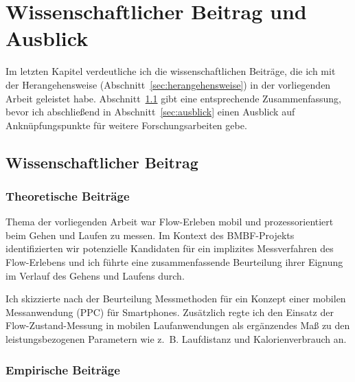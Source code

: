 

\chapter{Wissenschaftlicher Beitrag und Ausblick}

\label{cha:wissenschaftlicher_beitrag_und_ausblick}

Im letzten Kapitel verdeutliche ich die wissenschaftlichen Beiträge, die ich mit der Herangehensweise (Abschnitt~\ref{sec:herangehensweise}) in der vorliegenden Arbeit geleistet habe. Abschnitt~\ref{sec:wissenschaftlicher_beitrag} gibt eine entsprechende Zusammenfassung, bevor ich abschließend in Abschnitt~\ref{sec:ausblick} einen Ausblick auf Anknüpfungspunkte für weitere Forschungsarbeiten gebe.

\section{Wissenschaftlicher Beitrag} 

\label{sec:wissenschaftlicher_beitrag}

\subsection{Theoretische Beiträge} 

\label{sub:theoretische_beitrage}

Thema der vorliegenden Arbeit war Flow-Erleben mobil und prozessorientiert beim Gehen und Laufen zu messen. Im Kontext des \acs{BMBF}-Projekts identifizierten wir potenzielle Kandidaten für ein implizites Messverfahren des Flow-Erlebens und ich führte eine zusammenfassende Beurteilung ihrer Eignung im Verlauf des Gehens und Laufens durch. 

Ich skizzierte nach der Beurteilung Messmethoden für ein Konzept einer mobilen Messanwendung (\ac{PPC}) für Smartphones. Zusätzlich regte ich den Einsatz der Flow-Zustand-Messung in mobilen Laufanwendungen als ergänzendes Maß zu den leistungsbezogenen Parametern wie z.~B. Laufdistanz und Kalorienverbrauch an.

\subsection{Empirische Beiträge} 

\label{sub:empirische_beitrage}

